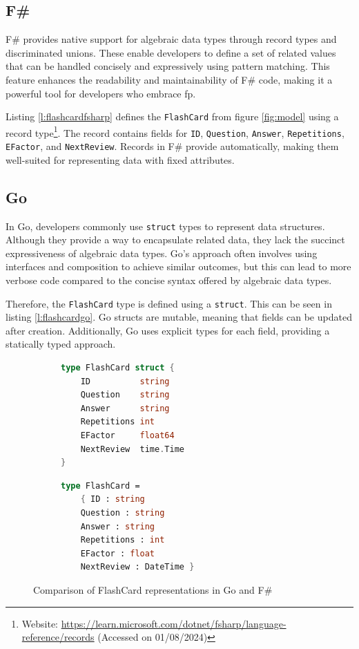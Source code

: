         \subsection*{F\#}
        F\# provides native support for algebraic data types through record types and discriminated unions. These enable developers to define a set of related values that can be handled concisely and expressively using pattern matching. This feature enhances the readability and maintainability of F\# code, making it a powerful tool for developers who embrace \ac{fp}.

        Listing \ref{l:flashcardfsharp} defines the \texttt{FlashCard} from figure \ref{fig:model} using a record type\footnote{Website: \url{https://learn.microsoft.com/dotnet/fsharp/language-reference/records} (Accessed on 01/08/2024)}. The record contains fields for \texttt{ID}, \texttt{Question}, \texttt{Answer}, \texttt{Repetitions}, \texttt{EFactor}, and \texttt{NextReview}. Records in F\# provide automatically, making them well-suited for representing data with fixed attributes.

        \subsection*{Go}
        In Go, developers commonly use \texttt{struct} types to represent data structures. Although they provide a way to encapsulate related data, they lack the succinct expressiveness of algebraic data types. Go's approach often involves using interfaces and composition to achieve similar outcomes, but this can lead to more verbose code compared to the concise syntax offered by algebraic data types.

        Therefore, the \texttt{FlashCard} type is defined using a \texttt{struct}. This can be seen in listing \ref{l:flashcardgo}. Go structs are mutable, meaning that fields can be updated after creation. Additionally, Go uses explicit types for each field, providing a statically typed approach.

\begin{figure}[ht]
\begin{subfigure}{0.48\textwidth}
\begin{lstlisting}[language=go, firstnumber=1, caption={FlashCard representation in Go}, label=l:flashcardgo]
type FlashCard struct {
    ID          string
    Question    string
    Answer      string
    Repetitions int
    EFactor     float64
    NextReview  time.Time
}
\end{lstlisting}
\end{subfigure}\hfill
\begin{subfigure}{0.48\textwidth}
\begin{lstlisting}[language=FSharp, firstnumber=1, caption={FlashCard representation in F\#}, label=l:flashcardfsharp]
type FlashCard =
    { ID : string
    Question : string
    Answer : string
    Repetitions : int
    EFactor : float
    NextReview : DateTime }
\end{lstlisting}
\end{subfigure}
\caption{Comparison of FlashCard representations in Go and F\#}
\label{fig:flashcardcomparison}
\end{figure}

